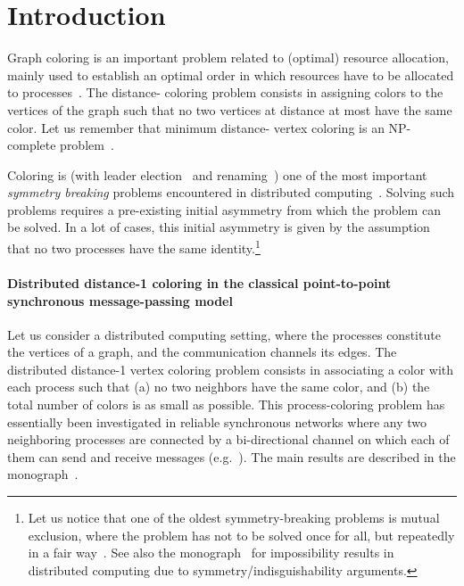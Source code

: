 \documentclass[11pt,english]{article}
\newcommand{\df}[1]{}\newcommand{\ccolor}{{\sc color}\xspace}
\begin{document}
\section{Introduction}
Graph coloring is an important problem related to (optimal) resource
allocation, mainly used to establish an optimal order in which
resources have to be allocated to processes~\cite{DKR82,L81}.  The
distance- coloring problem consists in assigning colors to the
vertices of the graph such that no two vertices at distance at most
 have the same color. Let us remember that minimum distance-
vertex coloring is an NP-complete problem~\cite{GJ79}.



Coloring is (with leader election~\cite{A81} and
renaming~\cite{ABDPR90,CRR11}) one of the most important {\it symmetry
  breaking} problems encountered in distributed
computing~\cite{IRR10}. Solving such problems requires\df{I removed
  ``a seed''. It struck me as odd. But add it back if it's commonly
  used with this meaning.}  a pre-existing initial asymmetry from which
the problem can be solved. In a lot of cases, this initial asymmetry
is given by the assumption that no two processes have the same
identity.\footnote{Let us notice that one of the oldest
  symmetry-breaking problems is mutual exclusion, where the problem
  has not to be solved once for all, but repeatedly in a fair
  way~\cite{R86}.  See also the monograph~\cite{AE14} for
  impossibility results in distributed computing due to
  symmetry/indisguishability arguments.}




\paragraph{Distributed distance-1 coloring in the classical point-to-point
synchronous message-passing model}
Let us consider a distributed computing setting, where the processes
constitute the vertices of a graph, and the communication channels its
edges. The distributed distance-1 vertex coloring problem consists in
associating a color with each process such that (a) no two neighbors
have the same color, and (b) the total number of colors is as small as
possible. This process-coloring problem has essentially been
investigated in reliable synchronous networks where any two
neighboring processes are connected by a bi-directional channel on
which each of them can send and receive messages
(e.g.~\cite{P00,R10,R13,S07}).  The main results are described in the
monograph~\cite{BE14}.  
\end{document}
